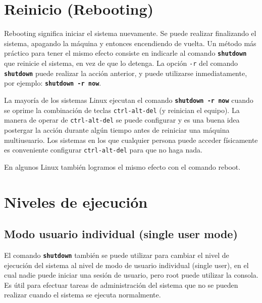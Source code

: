 \documentclass[12pt]{article}
\begin{document}
\section{ Reinicio (Rebooting)}

 Rebooting significa iniciar el sistema nuevamente. Se puede realizar
finalizando el sistema, apagando la máquina y entonces encendiendo de vuelta. Un
método más práctico para tener el mismo efecto consiste en indicarle al comando
\texttt{\textbf{shutdown}} que reinicie el sistema, en vez de que lo detenga.
La opción \texttt{-r} del comando \texttt{\textbf{shutdown}} puede
realizar la acción anterior, y puede utilizarse inmediatamente, por ejemplo:
\texttt{\textbf{shutdown -r now}}.  

 La mayoría de los sistemas Linux ejecutan el comando \texttt{\textbf{shutdown -r
now}} cuando se oprime la combinación de teclas \texttt{ctrl-alt-del} (y
reinician el equipo). La manera de operar de \texttt{ctrl-alt-del} se puede configurar y
es una buena idea postergar la acción durante algún tiempo antes de reiniciar
una máquina multiusuario. Los sistemas en los que cualquier persona puede
acceder físicamente es conveniente configurar \texttt{ctrl-alt-del} para que no haga
nada.

En algunos Linux también logramos el mismo efecto con el comando reboot.

\section {Niveles de ejecución}
\subsection{ Modo usuario individual (single user mode)}

 El comando \texttt{\textbf{shutdown}} también se puede utilizar para
cambiar el nivel de ejecución del sistema al nivel de modo de usuario individual
(single user), en el cual nadie puede iniciar una sesión de usuario, pero root
puede utilizar la consola. Es útil para efectuar tareas de administración del
sistema que no se pueden realizar cuando el sistema se ejecuta normalmente.
\end{document}
